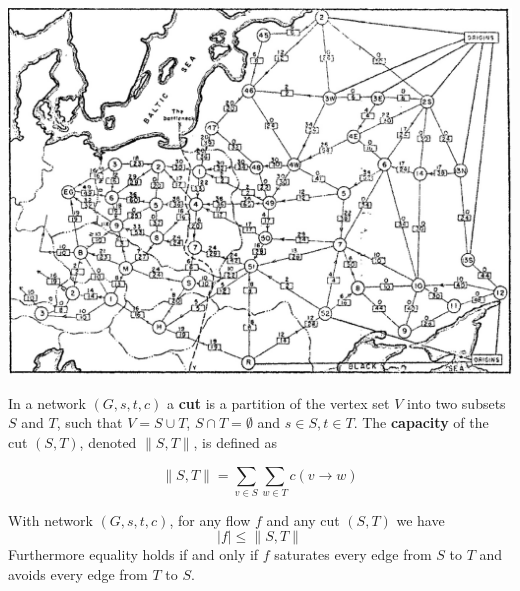 \begin{marginfigure}
\includegraphics[scale=0.15]{soviettrainnetwork.jpeg}
\end{marginfigure}

\begin{defn}\label{networkcut}
In a network $(G, s, t, c)$ a \textbf{cut} is a partition of the vertex set $V$ into two subsets $S$ and $T$, such that $V = S \cup T$, $S \cap T = \emptyset$ and $s \in S, t \in T$. The \textbf{capacity} of the cut $(S, T)$, denoted $\|S,T\|$, is defined as

$$
\|S, T\| = \sum_{v \in S} \sum_{w \in T} c(v \rightarrow w)
$$
\end{defn}

\begin{thm}\label{flowcut}
With network $(G, s, t, c)$, for any flow $f$ and any cut $(S, T)$ we have
$$
  |f| \leq \|S, T\|
$$
Furthermore equality holds if and only if $f$ saturates every edge from $S$ to $T$ and avoids every edge from $T$ to $S$.
\end{thm}

